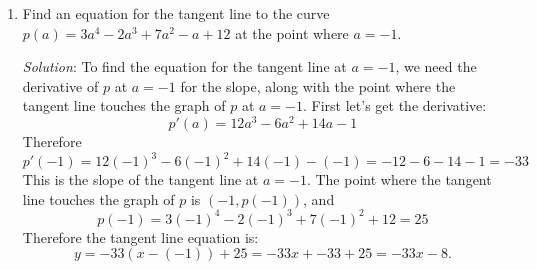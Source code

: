 \documentclass[11pt]{article}
\begin{document}
\begin{enumerate}
	\item Find an equation for the tangent line to the curve $p(a) = 3a^4 - 2a^3 + 7a^2 - a + 12$ at the point where $a = -1$. 
	
\noindent
\emph{Solution}: To find the equation for the tangent line at $a = -1$, we need the derivative of $p$ at $a=-1$ for the slope, along with the point where the tangent line touches the graph of $p$ at $a = -1$. First let's get the derivative: 
\[ p'(a) = 12a^3 - 6a^2 + 14a - 1 \]
Therefore 
\[ p'(-1) = 12(-1)^3 - 6(-1)^2 + 14(-1) - (-1) = -12 - 6 - 14 - 1 = -33 \]
This is the slope of the tangent line at $a = -1$. The point where the tangent line touches the graph of $p$ is $(-1, p(-1))$, and
\[ p(-1) = 3(-1)^4 - 2(-1)^3 + 7(-1)^2 + 12 = 25 \]
Therefore the tangent line equation is: 
\[ y = -33(x - (-1)) + 25 = -33x + -33 + 25 = -33x - 8. \]


\end{enumerate}
\end{document}
